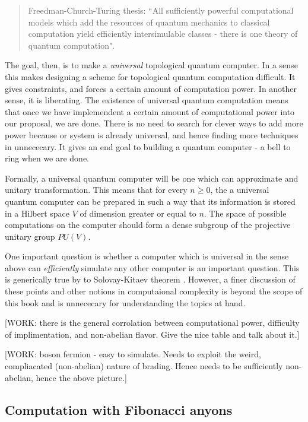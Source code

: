 \begin{quote}
Freedman-Church-Turing thesis: ``All sufficiently powerful computational models which add the resources of quantum mechanics to classical computation yield efficiently intersimulable classes - there is one theory of quantum computation".
\end{quote}


The goal, then, is to make a \textit{universal} topological quantum computer. In a sense this makes designing a scheme for topological quantum computation difficult. It gives constraints, and forces a certain amount of computation power. In another sense, it is liberating. The existence of universal quantum computation means that once we have implemendent a certain amount of computational power into our proposal, we are done. There is no need to search for clever ways to add more power because or system is already universal, and hence finding more techniques in unnececary. It gives an end goal to building a quantum computer - a bell to ring when we are done.

Formally, a universal quantum computer will be one which can approximate and unitary transformation. This means that for every $n\geq 0$, the a universal quantum computer can be prepared in such a way that its information is stored in a Hilbert space $V$ of dimension greater or equal to $n$. The space of possible computations on the computer should form a dense subgroup of the projective unitary group $PU(V)$.

One important question is whether a computer which is universal in the sense above can \textit{efficiently} simulate any other computer is an important question. This is generically true by to Solovay-Kitaev theorem \cite{kitaev1997quantum, nielsen2010quantum}. However, a finer discussion of these points and other notions in computaional complexity is beyond the scope of this book and is unnececary for understanding the topics at hand.

[WORK: there is the general corrolation between computational power, difficulty of implimentation, and non-abelian flavor. Give the nice table and talk about it.]

[WORK: boson fermion - easy to simulate. Needs to exploit the weird, compliacated (non-abelian) nature of brading. Hence needs to be sufficiently non-abelian, hence the above picture.]

\subsection{Computation with Fibonacci anyons}

